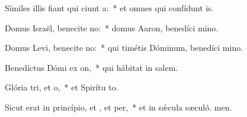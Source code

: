 \item Símiles illis fiant qui ciunt a:~* et omnes qui confídunt  is.
\item Domus Israël, benecite no:~* domus Aaron, benedíci mino.
\item Domus Levi, benecite no:~* qui timétis Dóminum, benedíci mino.
\item Benedíctus Dómi ex on,~* qui hábitat in salem.
\item Glória tri, et o,~* et Spirítu to.
\item Sicut erat in princípio, et , et per,~* et in sǽcula sæculó. men.
